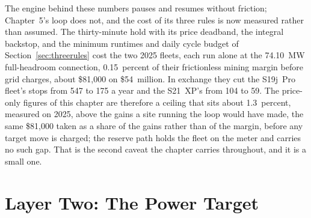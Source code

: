 The engine behind these numbers pauses and resumes without friction; Chapter~5's loop does not, and the cost of its three rules is now measured rather than assumed. The thirty-minute hold with its price deadband, the integral backstop, and the minimum runtimes and daily cycle budget of Section~\ref{sec:threerules} cost the two 2025 fleets, each run alone at the 74.10~MW full-headroom connection, 0.15~percent of their frictionless mining margin before grid charges, about \$81,000 on \$54~million. In exchange they cut the S19j~Pro fleet's stops from 547 to 175 a year and the S21~XP's from 104 to 59. %
The price-only figures of this chapter are therefore a ceiling that sits about 1.3~percent, measured on 2025, above the gains a site running the loop would have made, the same \$81,000 taken as a share of the gains rather than of the margin, before any target move is charged; the reserve path holds the fleet on the meter and carries no such gap. That is the second caveat the chapter carries throughout, and it is a small one. %

\section{Layer Two: The Power Target}
\label{sec:stack-power-target}

